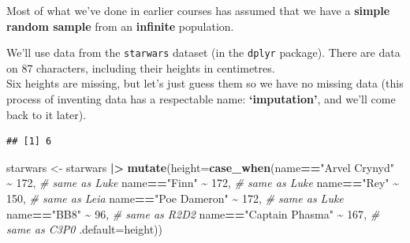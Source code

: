 \documentclass[
]{book}
\newenvironment{Shaded}{\begin{snugshade}}{\end{snugshade}}
\newcommand{\AttributeTok}[1]{\textcolor[rgb]{0.13,0.29,0.53}{#1}}
\newcommand{\CommentTok}[1]{\textcolor[rgb]{0.56,0.35,0.01}{\textit{#1}}}
\newcommand{\DecValTok}[1]{\textcolor[rgb]{0.00,0.00,0.81}{#1}}
\newcommand{\FunctionTok}[1]{\textcolor[rgb]{0.13,0.29,0.53}{\textbf{#1}}}
\newcommand{\NormalTok}[1]{#1}
\newcommand{\OtherTok}[1]{\textcolor[rgb]{0.56,0.35,0.01}{#1}}
\newcommand{\SpecialCharTok}[1]{\textcolor[rgb]{0.81,0.36,0.00}{\textbf{#1}}}
\newcommand{\StringTok}[1]{\textcolor[rgb]{0.31,0.60,0.02}{#1}}
\begin{document}
Most of what we've done in earlier courses has assumed that we have
a \textbf{simple random sample} from an \textbf{infinite} population.

We'll use data from the \texttt{starwars} dataset (in the \texttt{dplyr} package). There
are data on 87 characters, including their heights in centimetres.\\
Six heights are missing, but let's just guess them so we have no missing data
(this process of inventing data has a respectable name: \textbf{`imputation'},
and we'll come back to it later).

\begin{Shaded}
\end{Shaded}

\begin{verbatim}
## [1] 6
\end{verbatim}

\begin{Shaded}
\begin{Highlighting}[]
\NormalTok{starwars }\OtherTok{\textless{}{-}}\NormalTok{ starwars }\SpecialCharTok{|\textgreater{}} 
  \FunctionTok{mutate}\NormalTok{(}\AttributeTok{height=}\FunctionTok{case\_when}\NormalTok{(name}\SpecialCharTok{==}\StringTok{"Arvel Crynyd"} \SpecialCharTok{\textasciitilde{}} \DecValTok{172}\NormalTok{, }\CommentTok{\# same as Luke}
\NormalTok{                          name}\SpecialCharTok{==}\StringTok{"Finn"} \SpecialCharTok{\textasciitilde{}} \DecValTok{172}\NormalTok{, }\CommentTok{\# same as Luke}
\NormalTok{                          name}\SpecialCharTok{==}\StringTok{"Rey"} \SpecialCharTok{\textasciitilde{}} \DecValTok{150}\NormalTok{,  }\CommentTok{\# same as Leia}
\NormalTok{                          name}\SpecialCharTok{==}\StringTok{"Poe Dameron"} \SpecialCharTok{\textasciitilde{}} \DecValTok{172}\NormalTok{, }\CommentTok{\# same as Luke}
\NormalTok{                          name}\SpecialCharTok{==}\StringTok{"BB8"} \SpecialCharTok{\textasciitilde{}} \DecValTok{96}\NormalTok{, }\CommentTok{\# same as R2D2}
\NormalTok{                          name}\SpecialCharTok{==}\StringTok{"Captain Phasma"} \SpecialCharTok{\textasciitilde{}} \DecValTok{167}\NormalTok{, }\CommentTok{\# same as C3P0}
                          \AttributeTok{.default=}\NormalTok{height))}
\end{Highlighting}
\end{Shaded}
\end{document}
